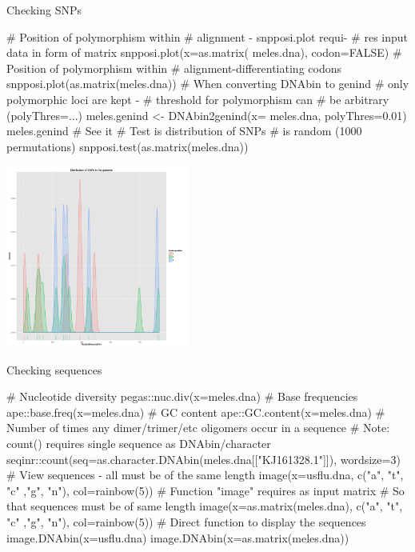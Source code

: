 \documentclass[compress, ucs, xelatex, 11pt, xcolor=svgnames,
  hyperref={
    bookmarks=true,
    unicode=true,
    colorlinks=true,
    pdftitle={Molecular data in R},
    plainpages=false,
    pdfauthor={Vojtech Zeisek},
    pdfsubject={Course about phylogeny and evolution in R},
    pdfcreator={XeLaTeX},
    pdfkeywords={R, evolution, phylogeny, molecular data},
    linkcolor=Tomato,
    anchorcolor=SaddleBrown,
    citecolor=Goldenrod,
    filecolor=DarkMagenta,
    menucolor=Sienna,
    urlcolor=DarkTurquoise,
    pdftex},
  url={hyphens, lowtilde} %
  ]{beamer}
\begin{document}
\begin{frame}[fragile]{Checking SNPs}
\begin{multicols}{2}
  \begin{spluscode}
    # Position of polymorphism within
    # alignment - snpposi.plot requi-
    # res input data in form of matrix
    snpposi.plot(x=as.matrix(
      meles.dna), codon=FALSE)
    # Position of polymorphism within
    # alignment-differentiating codons
    snpposi.plot(as.matrix(meles.dna))
    # When converting DNAbin to genind
    # only polymorphic loci are kept -
    # threshold for polymorphism can
    # be arbitrary (polyThres=...)
    meles.genind <- DNAbin2genind(x=
      meles.dna, polyThres=0.01)
    meles.genind # See it
    # Test is distribution of SNPs
    # is random (1000 permutations)
    snpposi.test(as.matrix(meles.dna))
  \end{spluscode}
  \begin{flushright}
    \includegraphics[height=6cm]{snpposi.png}
  \end{flushright}
\end{multicols}
\end{frame}

\begin{frame}[fragile]{Checking sequences}
  \begin{spluscode}
    # Nucleotide diversity
    pegas::nuc.div(x=meles.dna)
    # Base frequencies
    ape::base.freq(x=meles.dna)
    # GC content
    ape::GC.content(x=meles.dna)
    # Number of times any dimer/trimer/etc oligomers occur in a sequence
    # Note: count() requires single sequence as DNAbin/character
    seqinr::count(seq=as.character.DNAbin(meles.dna[["KJ161328.1"]]),
      wordsize=3)
    # View sequences - all must be of the same length
    image(x=usflu.dna, c("a", "t", "c" ,"g", "n"), col=rainbow(5))
    # Function "image" requires as input matrix
    # So that sequences must be of same length
    image(x=as.matrix(meles.dna), c("a", "t", "c" ,"g", "n"),
      col=rainbow(5))
    # Direct function to display the sequences
    image.DNAbin(x=usflu.dna)
    image.DNAbin(x=as.matrix(meles.dna))
  \end{spluscode}
\end{frame}
\end{document}
